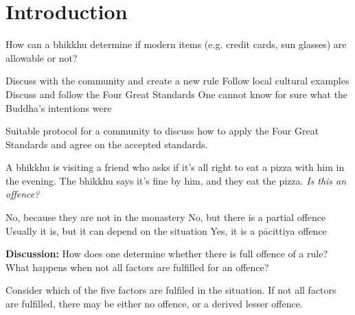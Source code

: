 \chapter{Introduction}
\renewcommand*{\theChapterTitle}{Introduction}

\begin{exam}{\autoExamName}

\begin{problem}

  How can a bhikkhu determine if modern items (e.g. credit cards, sun glasses) are allowable or not?

  \bigskip

  \begin{answers}{1}
    \bChoices
     Discuss with the community and create a new rule\eAns
     Follow local cultural examples\eAns
     Discuss and follow the Four Great Standards\eAns
     One cannot know for sure what the Buddha's intentions were\eAns
    \eChoices
  \end{answers}

  \begin{solution}
    Suitable protocol for a community to discuss how to apply the Four Great
    Standards and agree on the accepted standards.
  \end{solution}

\end{problem}

\problemDivide

\begin{problem}

  A bhikkhu is visiting a friend who asks if it's all right to eat a pizza with
  him in the evening. The bhikkhu says it's fine by him, and they eat the pizza.
  \emph{Is this an offence?}

  \bigskip

  \begin{answers}{1}
    \bChoices
     No, because they are not in the monastery\eAns
     No, but there is a partial offence\eAns
     Usually it is, but it can depend on the situation\eAns
     Yes, it is a pācittiya offence\eAns
    \eChoices
  \end{answers}

  \bigskip

  \textbf{Discussion:} How does one determine whether there is full offence of a
  rule? What happens when not all factors are fulfilled for an offence?

  \begin{solution}
    Consider which of the five factors are fulfiled in the situation. If not all
    factors are fulfilled, there may be either no offence, or a derived lesser
    offence.
  \end{solution}


\end{problem}
\end{exam}
